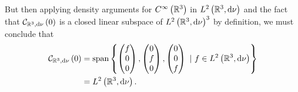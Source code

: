 But then applying density arguments for $C^{\infty}\left( \mathbb{R}^3 \right)$ in $L^{2}\left( \mathbb{R}^3,\mathrm{d}\nu \right)$ and the fact that $\mathcal{C}_{ \mathbb{R}^3, \mathrm{d}\nu}\left( 0 \right)$ is a closed linear subspace of $L^{2}\left( \mathbb{R}^3,\mathrm{d}\nu \right)^3$ by definition, we must conclude that
\begin{align*}
	\mathcal{C}_{ \mathbb{R}^3, \mathrm{d}\nu}\left( 0 \right) &= \mathrm{span}\left\{ 	
	\begin{pmatrix}	f \\ 0 \\ 0	\end{pmatrix},
	\begin{pmatrix}	0 \\ f \\ 0	\end{pmatrix},
	\begin{pmatrix}	0 \\ 0 \\ f	\end{pmatrix}
	\ \vert \ f\in L^{2}\left( \mathbb{R}^3,\mathrm{d}\nu \right)
	 \right\} \\
	&= L^{2}\left( \mathbb{R}^3,\mathrm{d}\nu \right).
\end{align*}


